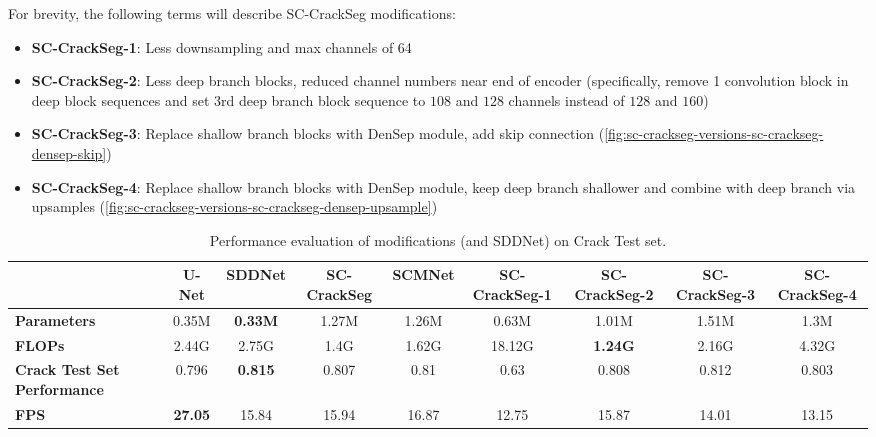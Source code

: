 \documentclass[a4paper,12pt]{report}
\begin{document}
For brevity, the following terms will describe SC-CrackSeg modifications:
\begin{itemize}
    \item \textbf{SC-CrackSeg-1}: Less downsampling and max channels of 64
    \item \textbf{SC-CrackSeg-2}: Less deep branch blocks, reduced channel numbers near end of encoder (specifically, remove 1 convolution block in deep block sequences and set 3rd deep branch block sequence to $108$ and $128$ channels instead of $128$ and $160$)
    \item \textbf{SC-CrackSeg-3}: Replace shallow branch blocks with DenSep module, add skip connection (\autoref{fig:sc-crackseg-versions-sc-crackseg-densep-skip})
    \item \textbf{SC-CrackSeg-4}: Replace shallow branch blocks with DenSep module, keep deep branch shallower and combine with deep branch via upsamples (\autoref{fig:sc-crackseg-versions-sc-crackseg-densep-upsample})
\end{itemize}

\begin{table}[htbp]
    \begin{adjustbox}{width=\columnwidth,center}
        \begin{tabular}{|p{}|c|c|c|c|c|c|c|c|}
            \hline
                                                & \textbf{U-Net} & \textbf{SDDNet} & \textbf{SC-CrackSeg} & \textbf{SCMNet} & \textbf{SC-CrackSeg-1} & \textbf{SC-CrackSeg-2} & \textbf{SC-CrackSeg-3} & \textbf{SC-CrackSeg-4} \\
            \hline
            \textbf{Parameters}                 & 0.35M          & \textbf{0.33M}  & 1.27M                & 1.26M           & 0.63M                  & 1.01M                  & 1.51M                  & 1.3M                   \\
            \hline
            \textbf{FLOPs}                      & 2.44G          & 2.75G           & 1.4G                 & 1.62G           & 18.12G                 & \textbf{1.24G}         & 2.16G                  & 4.32G                  \\
            \hline
            \textbf{Crack Test Set Performance} & 0.796          & \textbf{0.815}  & 0.807                & 0.81            & 0.63                   & 0.808                  & 0.812                  & 0.803                  \\
            \hline
            \textbf{FPS}                        & \textbf{27.05} & 15.84           & 15.94                & 16.87           & 12.75                  & 15.87                  & 14.01                  & 13.15                  \\
            \hline
        \end{tabular}
    \end{adjustbox}
    \caption{Performance evaluation of modifications (and SDDNet) on Crack Test set.}%
    \label{}
\end{table}
\end{document}
